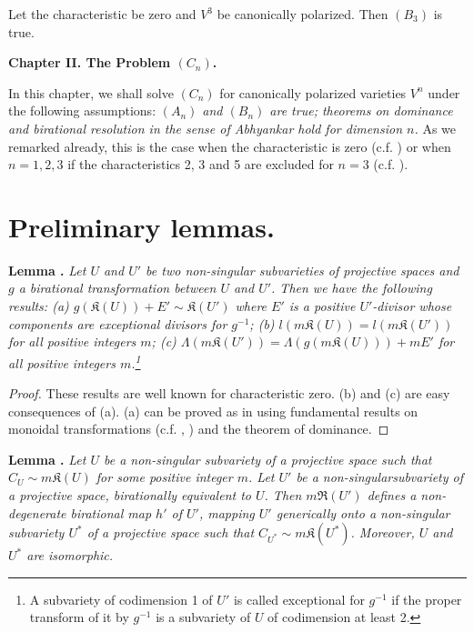 \begin{coro*}
Let the characteristic be zero and $V^{3}$ be canonically polarized. Then $(B_{3})$ is true.
\end{coro*}

\bigskip

\begin{center}
{\Large\bf Chapter II. The Problem \boldmath$(C_{n})$.}
\end{center}

In this chapter, we shall solve $(C_{n})$ for canonically polarized varieties $V^{n}$ under the following assumptions: {\em $(A_{n})$ and $(B_{n})$ are true; theorems on dominance and birational resolution in the sense of Abhyankar hold for dimension $n$.} As we remarked already, this is the case when the characteristic is zero (c.f. \cite{art14-key5}) or when $n=1,2,3$ if the characteristics 2, 3 and 5 are excluded for $n=3$ (c.f. \cite{art14-key35}).

\section{Preliminary lemmas.}\label{art14-sec8}

\medskip
\noindent
{\bf Lemma .\label{art14-lem12}}
{\em Let $U$ and $U'$ be two non-singular subvarieties of projective spaces and $g$ a birational transformation between $U$ and $U'$. Then we have the following results: {\rm(a)} $g(\mathfrak{K}(U))+E'\sim \mathfrak{K}(U')$ where $E'$ is a positive $U'$-divisor whose components are exceptional divisors for $g^{-1}$; {\rm(b)} $l(m\mathfrak{K}(U))=l(m\mathfrak{K}(U'))$ for all positive integers $m$; {\rm(c)} $\Lambda(m\mathfrak{K}(U'))=\Lambda(g(m\mathfrak{K}(U)))+mE'$ for all positive integers $m$.\footnote{A subvariety of codimension 1 of $U'$ is called exceptional for $g^{-1}$ if the proper transform of it by $g^{-1}$ is a subvariety of $U$ of codimension at least 2.}}

\begin{proof}
These results are well known for characteristic zero. (b) and (c) are easy consequences of (a). (a) can be proved as in \cite{art14-key33} using fundamental results on monoidal transformations (c.f. \cite{art14-key29}, \cite{art14-key33}) and the theorem of dominance.
\end{proof}

\medskip
\noindent
{\bf Lemma .\label{art14-lem13}}
{\em Let $U$ be a non-singular subvariety of a projective space such that $C_{U}\sim m\mathfrak{K}(U)$ for some positive integer $m$. Let $U'$ be a non-singular\pageoriginale subvariety of a projective space, birationally equivalent to $U$. Then $m\mathfrak{R}(U')$ defines a non-degenerate birational map $h'$ of $U'$, mapping $U'$ generically onto a non-singular subvariety $U^{*}$ of a projective space such that $C_{U^{*}}\sim m\mathfrak{K}(U^{*})$. Moreover, $U$ and $U^{*}$ are isomorphic.}


